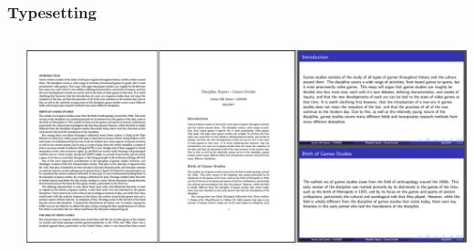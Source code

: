 \documentclass[aspectratio = 169]{beamer}
\begin{document}

\begin{frame}
\label{introII}
\frametitle{Typesetting}

\begin{columns}



\hyperlink{introI}{} \newline
\hyperlink{introII}{} \newline 
\hyperlink{scoping}{} \newline
\hyperlink{elaboration}{} \newline  
\hyperlink{software}{} \newline 
\hyperlink{toolchain}{} \newline 
\hyperlink{learning}{} \newline 
\hyperlink{problems}{} \newline 
\hyperlink{results}{} \newline
\hyperlink{exampleI}{} \newline 
\hyperlink{exampleII}{}  



\includegraphics[scale = 0.3]{typeset}

\end{columns}
\end{frame}



\end{document}

